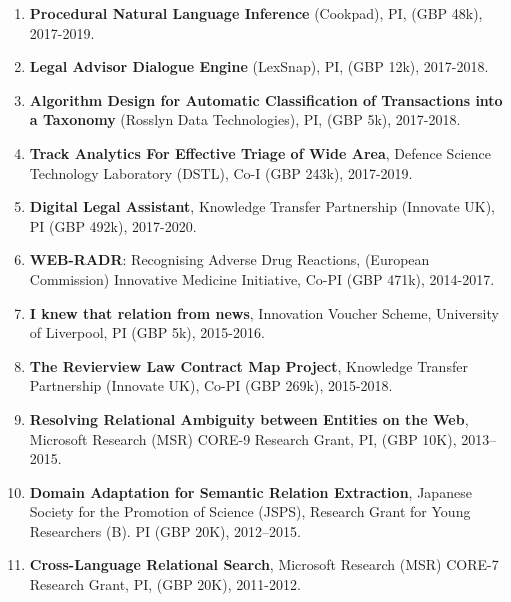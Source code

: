 \documentclass[a4paper,11pt]{article}
\begin{document}
\begin{enumerate}

\item \textbf{Procedural Natural Language Inference} (Cookpad), PI, (GBP 48k), 2017-2019.

\item \textbf{Legal Advisor Dialogue Engine} (LexSnap), PI, (GBP 12k), 2017-2018.

\item \textbf{Algorithm Design for Automatic Classification of Transactions into a Taxonomy} (Rosslyn Data Technologies), PI, (GBP 5k), 2017-2018.


\item \textbf{Track Analytics For Effective Triage of Wide Area}, Defence Science Technology Laboratory (DSTL), Co-I (GBP 243k), 2017-2019.

\item \textbf{Digital Legal Assistant}, Knowledge Transfer Partnership (Innovate UK), PI (GBP 492k), 2017-2020.

\item \textbf{WEB-RADR}: Recognising Adverse Drug Reactions, (European Commission) Innovative Medicine Initiative, Co-PI (GBP 471k), 2014-2017.

\item \textbf{I knew that relation from news}, Innovation Voucher Scheme, University of Liverpool, PI (GBP 5k), 2015-2016.

\item \textbf{The Revierview Law Contract Map Project}, Knowledge Transfer Partnership (Innovate UK), Co-PI (GBP 269k), 2015-2018.

\item \textbf{Resolving Relational Ambiguity between Entities on the Web}, Microsoft Research (MSR) CORE-9 Research Grant, PI, (GBP 10K), 2013–2015.

\item \textbf{Domain Adaptation for Semantic Relation Extraction}, Japanese Society for the Promotion of Science (JSPS), Research Grant for Young Researchers (B). PI (GBP 20K), 2012–2015.

\item \textbf{Cross-Language Relational Search}, Microsoft Research (MSR) CORE-7 Research Grant, PI, (GBP 20K), 2011-2012.


\end{enumerate}
\end{document}
